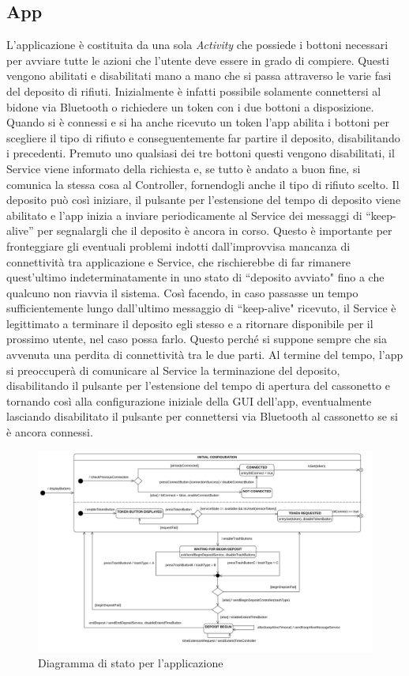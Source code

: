 \documentclass[a4paper, 12pt]{report}
\begin{document}
			\subsection{App}
			L'applicazione è costituita da una sola \textit{Activity} che possiede i bottoni necessari per
			avviare tutte le azioni che l'utente deve essere in grado di compiere. Questi vengono abilitati e
			disabilitati mano a mano che si passa attraverso le varie fasi del deposito di rifiuti.
			Inizialmente è infatti possibile solamente connettersi al bidone via Bluetooth o
			richiedere un token con i due bottoni a disposizione. Quando si è connessi e si ha anche
			ricevuto un token l'app abilita i bottoni per scegliere il tipo di rifiuto e
			conseguentemente far partire il deposito, disabilitando i precedenti. Premuto uno qualsiasi
			dei tre bottoni questi vengono disabilitati, il Service viene informato della
			richiesta e, se tutto è andato a buon fine, si comunica la stessa cosa al Controller,
			fornendogli anche il tipo di rifiuto scelto. Il deposito può così iniziare, il pulsante 
			per l'estensione del tempo di deposito  viene abilitato e l'app inizia a inviare periodicamente 
			al Service dei messaggi di ``keep-alive'' per segnalargli che il deposito è ancora in corso.
			Questo è importante per fronteggiare gli eventuali problemi indotti dall'improvvisa mancanza
			di connettività tra applicazione e Service, che rischierebbe di far rimanere quest'ultimo
			indeterminatamente
			in uno stato di ``deposito avviato" fino a che qualcuno non riavvia il sistema. Così
			facendo, in caso passasse un tempo sufficientemente lungo dall'ultimo messaggio di
			``keep-alive" ricevuto, il Service è legittimato a terminare il deposito egli stesso e a
			ritornare disponibile per il prossimo utente, nel caso possa farlo. Questo perché si suppone
			sempre che sia avvenuta una perdita di connettività tra le due parti.
			Al termine del tempo, l'app 
			si preoccuperà di comunicare al Service la terminazione del deposito, disabilitando il pulsante 
			per l'estensione del tempo di apertura del cassonetto e tornando così alla configurazione iniziale 
			della GUI dell'app, eventualmente lasciando disabilitato il pulsante per connettersi via Bluetooth 
			al cassonetto se si è ancora connessi.
			\begin{figure}[H]
				\centering
				\includegraphics[width=1.03\textwidth]{"img/AppStatechart"}    
				\caption{Diagramma di stato per l'applicazione}
			\end{figure}
\end{document}
